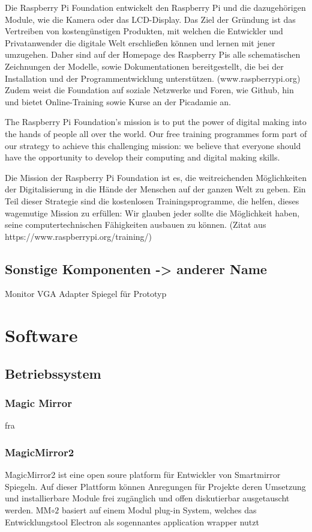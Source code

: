 \documentclass[12pt,a4paper]{report}
\begin{document}
Die Raspberry Pi Foundation entwickelt den Raspberry Pi und die dazugehörigen Module, wie die Kamera oder das LCD-Display. Das Ziel der Gründung ist das Vertreiben von kostengünstigen Produkten, mit welchen die Entwickler und Privatanwender die digitale Welt erschließen können und lernen mit jener umzugehen. Daher sind auf der Homepage des Raspberry Pis alle schematischen Zeichnungen der Modelle, sowie Dokumentationen bereitgestellt, die bei der Installation und der Programmentwicklung unterstützen. (www.raspberrypi.org)
Zudem weist die Foundation auf soziale Netzwerke und Foren, wie Github, hin und bietet Online-Training sowie Kurse an der Picadamie an.

The Raspberry Pi Foundation’s mission is to put the power of digital making into the hands of people all over the world. Our free training programmes form part of our strategy to achieve this challenging mission: we believe that everyone should have the opportunity to develop their computing and digital making skills.

Die Mission der Raspberry Pi Foundation ist es, die weitreichenden Möglichkeiten der Digitalisierung in die Hände der Menschen auf der ganzen Welt zu geben. Ein Teil dieser Strategie sind die kostenlosen Trainingsprogramme, die helfen, dieses wagemutige Mission zu erfüllen: Wir glauben jeder sollte die Möglichkeit haben, seine computertechnischen Fähigkeiten ausbauen zu können. (Zitat aus https://www.raspberrypi.org/training/)

\section{Sonstige Komponenten -> anderer Name}
Monitor VGA Adapter Spiegel für Prototyp
\chapter{Software}
\section{Betriebssystem}
\subsection*{Magic Mirror}
fra
\subsection*{MagicMirror2}
MagicMirror2 ist eine open soure platform für Entwickler von Smartmirror Spiegeln. Auf dieser Plattform können Anregungen für Projekte deren Umsetzung und installierbare Module frei zugänglich und offen diskutierbar ausgetauscht werden. MM$\circ{2}$ basiert auf einem Modul plug-in System, welches das Entwicklungstool Electron als sogennantes application wrapper nutzt 
\end{document}
